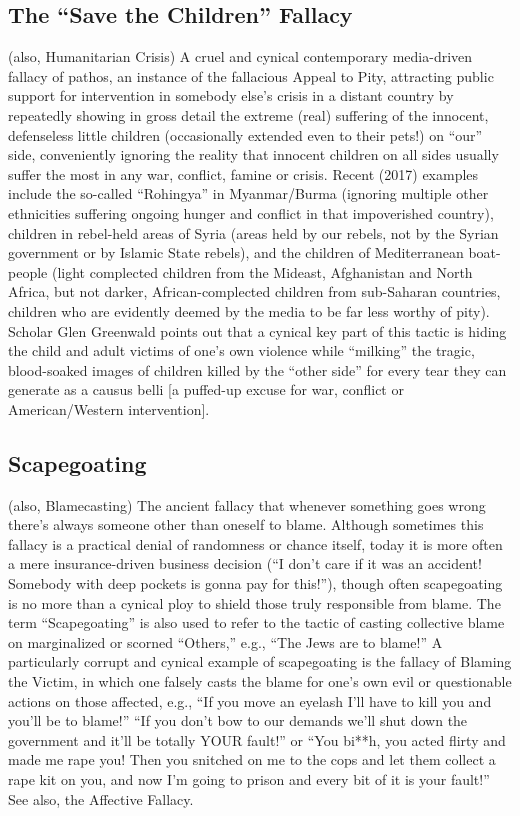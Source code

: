 \documentclass[10pt,a4paper,british]{article}
\begin{document}
\begin{multicols}{2}
	\subsection{The ``Save the Children'' Fallacy} (also, Humanitarian Crisis) A cruel and cynical contemporary media{-}driven fallacy of pathos, an instance of the fallacious Appeal to Pity, attracting public support for intervention in somebody else's crisis in a distant country by repeatedly showing in gross detail the extreme (real) suffering of the innocent, defenseless little children (occasionally extended even to their pets!) on ``our'' side, conveniently ignoring the reality that innocent children on all sides usually suffer the most in any war, conflict, famine or crisis.  Recent (2017) examples include the so{-}called ``Rohingya'' in Myanmar/Burma (ignoring multiple other ethnicities suffering ongoing hunger and conflict in that impoverished country), children in rebel{-}held areas of Syria (areas held by our rebels, not by the Syrian government or by Islamic State rebels), and the children of Mediterranean boat{-}people (light complected children from the Mideast, Afghanistan and North Africa, but not darker, African{-}complected children from sub{-}Saharan countries, children who are evidently deemed by the media to be far less worthy of pity). Scholar Glen Greenwald points out that a cynical key part of this tactic is hiding the child and adult victims of one's own violence while ``milking'' the tragic, blood{-}soaked images of children killed by the ``other side'' for every tear they can generate as a causus belli [a puffed{-}up excuse for war, conflict or American/Western intervention].  

	\subsection{Scapegoating} (also, Blamecasting) The ancient fallacy that whenever something goes wrong there's always someone other than oneself to blame. Although sometimes this fallacy is a practical denial of randomness or chance itself, today it is more often a mere insurance{-}driven business decision (``I don't care if it was an accident! Somebody with deep pockets is gonna pay for this!''), though often scapegoating is no more than a cynical ploy to shield those truly responsible from blame. The term ``Scapegoating'' is also used to refer to the tactic of casting collective blame on marginalized or scorned ``Others,'' e.g., ``The Jews are to blame!'' A particularly corrupt and cynical example of scapegoating is the fallacy of Blaming the Victim, in which one falsely casts the blame for one's own evil or questionable actions on those affected, e.g., ``If you move an eyelash I'll have to kill you and you'll be to blame!'' ``If you don't bow to our demands we'll shut down the government and it'll be totally YOUR fault!'' or ``You bi**h, you acted flirty and made me rape you! Then you snitched on me to the cops and let them collect a rape kit on you, and now I'm going to prison and every bit of it is your fault!'' See also, the Affective Fallacy.  


\end{multicols}
\end{document}
